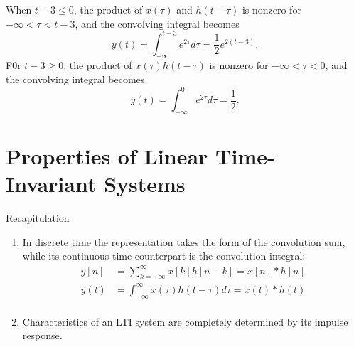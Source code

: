 \begin{frame}
    When $t-3 \leq 0$, the product of $x(\tau)$ and $h(t-\tau)$ is nonzero for $-\infty < \tau < t-3$, and the convolving integral becomes
    \begin{equation*}
        y(t) = \int_{-\infty}^{t-3}e^{2\tau}d\tau = \frac{1}{2}e^{2(t-3)}.
    \end{equation*}
    F0r $t-3 \geq 0$, the product of $x(\tau)h(t-\tau)$ is nonzero for $-\infty < \tau < 0$, and the convolving integral becomes
    \begin{equation*}
        y(t) = \int_{-\infty}^{0}e^{2\tau}d\tau = \frac{1}{2}.
    \end{equation*}
\end{frame}



\section{Properties of Linear Time-Invariant Systems}


\begin{frame}{Recapitulation}
    \begin{enumerate}
        \item In discrete time the representation takes the form of the convolution sum, while its continuous-time counterpart is the convolution integral:
            \begin{align*}
                y[n] &= \sum_{k=-\infty}^{\infty}x[k]h[n-k] = x[n]\ast h[n]\\
                y(t) &= \int_{-\infty}^{\infty}x(\tau)h(t-\tau)d\tau = x(t)\ast h(t)\\
            \end{align*}
        \item Characteristics of an LTI system are completely determined by its impulse response.
    \end{enumerate}

\end{frame}



